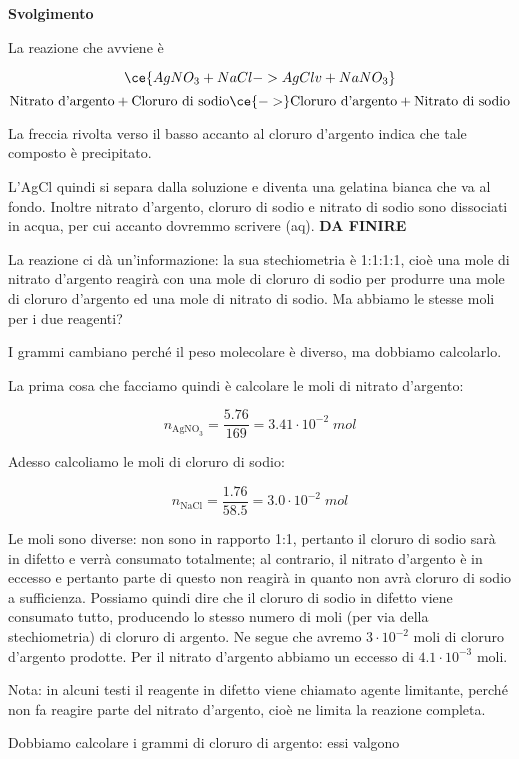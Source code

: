\vspace{0.2cm}\large\textbf{Svolgimento}\normalsize

\vspace{0.2cm}La reazione che avviene è

$$\ce{AgNO_3 + NaCl -> AgCl v + NaNO_3}$$
$$\text{Nitrato d'argento} + \text{Cloruro di sodio} \ce{->} \text{Cloruro d'argento} + \text{Nitrato di sodio}$$

La freccia rivolta verso il basso accanto al cloruro d'argento indica che tale composto è precipitato.

L'AgCl quindi si separa dalla soluzione e diventa una gelatina bianca che va al fondo. Inoltre nitrato d'argento, cloruro di sodio e nitrato di sodio sono dissociati in acqua, per cui accanto dovremmo scrivere (aq). \textbf{DA FINIRE}

La reazione ci dà un'informazione: la sua stechiometria è 1:1:1:1, cioè una mole di nitrato d'argento reagirà con una mole di cloruro di sodio per produrre una mole di cloruro d'argento ed una mole di nitrato di sodio. Ma abbiamo le stesse moli per i due reagenti?

I grammi cambiano perché il peso molecolare è diverso, ma dobbiamo calcolarlo.

La prima cosa che facciamo quindi è calcolare le moli di nitrato d'argento:

$$n_{\text{AgNO}_3}=\frac{5.76}{169}=3.41 \cdot 10^{-2} \; mol $$

Adesso calcoliamo le moli di cloruro di sodio:

$$n_{\text{NaCl}}=\frac{1.76}{58.5}=3.0 \cdot 10^{-2} \; mol $$

Le moli sono diverse: non sono in rapporto 1:1, pertanto il cloruro di sodio sarà in difetto e verrà consumato totalmente; al contrario, il nitrato d'argento è in eccesso e pertanto parte di questo non reagirà in quanto non avrà cloruro di sodio a sufficienza. Possiamo quindi dire che il cloruro di sodio in difetto viene consumato tutto, producendo lo stesso numero di moli (per via della stechiometria) di cloruro di argento. Ne segue che avremo $3 \cdot 10^{-2}$ moli di cloruro d'argento prodotte. Per il nitrato d'argento abbiamo un eccesso di $4.1 \cdot 10^{-3}$ moli.

Nota: in alcuni testi il reagente in difetto viene chiamato agente limitante, perché non fa reagire parte del nitrato d'argento, cioè ne limita la reazione completa.

Dobbiamo calcolare i grammi di cloruro di argento: essi valgono

